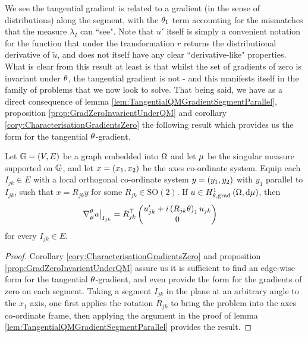We see the tangential gradient is related to a gradient (in the sense of distributions) along the segment, with the $\theta_1$ term accounting for the mismatches that the measure $\lambda_I$ can ``see".
Note that $u'$ itself is simply a convenient notation for the function that under the transformation $r$ returns the distributional derivative of $\widetilde{u}$, and does not itself have any clear ``derivative-like" properties.
What is clear from this result at least is that whilst the set of gradients of zero is invariant under $\theta$, the tangential gradient is not - and this manifests itself in the family of problems that we now look to solve.
That being said, we have as a direct consequence of lemma \ref{lem:TangentialQMGradientSegmentParallel}, proposition \ref{prop:GradZeroInvarientUnderQM} and corollary \ref{cory:CharacterisationGradientsZero} the following result which provides us the form for the tangential $\theta$-gradient.
\begin{cory} \label{cory:TangentialQMGradientGraphs}
	Let $\mathbb{G}=(V,E)$ be a graph embedded into $\Omega$ and let $\mu$ be the singular measure supported on $\mathbb{G}$, and let $x=\left( x_1,x_2 \right)$ be the axes co-ordinate system.
	Equip each $I_{jk}\in E$ with a local orthogonal co-ordinate system $y=\left( y_1,y_2 \right)$ with $y_1$ parallel to $I_{jk}$, such that $x = R_{jk}y$ for some $R_{jk}\in\mathrm{SO}(2)$.
	If $u\in H^1_{\theta, \mathrm{grad}}\left( \Omega, \mathrm{d}\mu \right)$, then
	\begin{align*}
		\nabla_\mu^\theta u \big\vert_{I_{jk}} &= R_{jk}^\top \begin{pmatrix} u_{jk}' + i\left( R_{jk}\theta \right)_1 u_{jk} \\ 0 \end{pmatrix}
	\end{align*}
	for every $I_{jk}\in E$.
\end{cory}
\begin{proof}
	Corollary \ref{cory:CharacterisationGradientsZero} and proposition \ref{prop:GradZeroInvarientUnderQM} assure us it is sufficient to find an edge-wise form for the tangential $\theta$-gradient, and even provide the form for the gradients of zero on each segment.
	Taking a segment $I_{jk}$ in the plane at an arbitrary angle to the $x_1$ axis, one first applies the rotation $R_{jk}$ to bring the problem into the axes co-ordinate frame, then applying the argument in the proof of lemma \ref{lem:TangentialQMGradientSegmentParallel} provides the result.
\end{proof}

